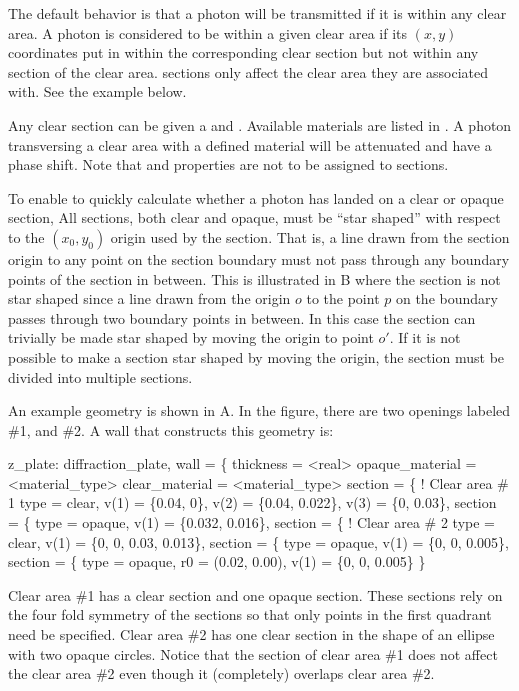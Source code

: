 The default behavior is that a photon will be transmitted if it is within any clear area. A photon
is considered to be within a given clear area if its $(x,y)$ coordinates put in within the
corresponding clear section but not within any  section of the clear area.  
sections only affect the clear area they are associated with. See the example below.

Any clear section can be given a  and . Available materials are listed in
. A photon transversing a clear area with a defined material will be attenuated
and have a phase shift. Note that  and  properties are not to be assigned
to  sections.

To enable \bmad to quickly calculate whether a photon has landed on a clear or opaque section, All
sections, both clear and opaque, must be ``star shaped'' with respect to the $(x_0, y_0)$ origin
used by the section. That is, a line drawn from the section origin to any point on the section
boundary must not pass through any boundary points of the section in between. This is illustrated in
B where the section is not star shaped since a line drawn from the origin $o$ to
the point $p$ on the boundary passes through two boundary points in between. In this case the
section can trivially be made star shaped by moving the origin to point $o'$. If it is not possible
to make a section star shaped by moving the origin, the section must be divided into multiple
sections.

An example geometry is shown in A.  In the figure, there are two openings labeled
\#1, and \#2. A wall that constructs this geometry is:
\begin{example}
  z_plate: diffraction_plate, wall = \{
    thickness = <real>
    opaque_material = <material_type>
    clear_material = <material_type>
    section = \{           ! Clear area \# 1
      type = clear, 
      v(1) = \{0.04, 0\}, v(2) = \{0.04, 0.022\},
      v(3) = \{0, 0.03\},
    section = \{
      type = opaque,
      v(1) = \{0.032, 0.016\},
    section = \{          ! Clear area \# 2
      type = clear,
      v(1) = \{0, 0, 0.03, 0.013\},
    section = \{
      type = opaque,
      v(1) = \{0, 0, 0.005\},
    section = \{
      type = opaque,
      r0 = (0.02, 0.00),
      v(1) = \{0, 0, 0.005\} \}
\end{example}
Clear area \#1 has a clear section and one opaque section. These sections rely on the four fold
symmetry of the sections so that only points in the first quadrant need be specified. Clear area \#2
has one clear section in the shape of an ellipse with two opaque circles. Notice that the
 section of clear area \#1 does not affect the clear area \#2 even though it (completely)
overlaps clear area \#2.

